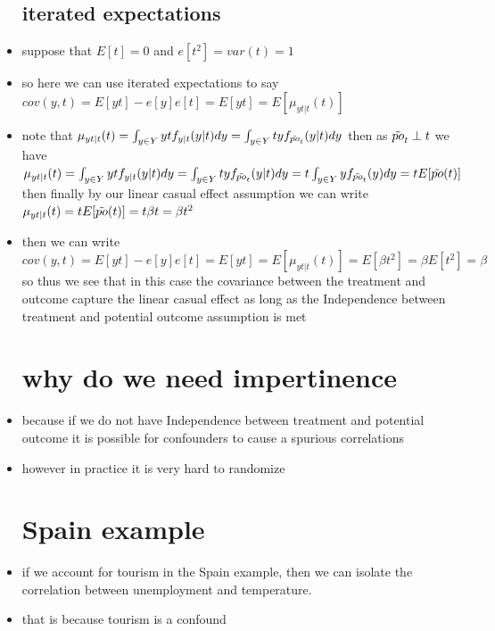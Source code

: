 \documentclass{article}
\begin{document}
\begin{itemize}
\subsection{iterated expectations}
\item suppose that $E[t]=0$ and $e[t^2]=var(t)=1$
\item so here we can use iterated expectations to say $cov(y,t)=E[yt]-e[y]e[t]=E[yt]=E[\mu_{yt|t}(t)]$
\item note that $\mu_{yt|t}(t)=\int_{y\in Y}ytf_{y|t}(y|t)dy=\int_{y\in Y}tyf_{\Tilde{po}_{t}}(y|t)dy$ then as $\Tilde{po}_{t}\perp t$ we have $\mu_{yt|t}(t)=\int_{y\in Y}ytf_{y|t}(y|t)dy=\int_{y\in Y}tyf_{\Tilde{po}_{t}}(y|t)dy=t\int_{y\in Y}yf_{\Tilde{po}_{t}}(y)dy=tE[\Tilde{po}(t)]$ then finally by our linear casual effect assumption we can write $\mu_{yt|t}(t)=tE[\Tilde{po}(t)]=t\beta t=\beta t^2$
\item then we can write $cov(y,t)=E[yt]-e[y]e[t]=E[yt]=E[\mu_{yt|t}(t)]=E[\beta t^2]=\beta E[t^2]=\beta $ so thus we see that in this case the covariance between the treatment and outcome capture the linear casual effect as long as the Independence between treatment and potential outcome assumption is met 
\section{why do we need impertinence}
\item because if we do not have Independence between treatment and potential outcome it is possible for confounders to cause a spurious correlations 
\item however in practice it is very hard to randomize 
\section{Spain example}
\item if we account for tourism in the Spain example, then we can isolate the correlation between unemployment and temperature.
\item that is because tourism is a confound

\end{itemize}
\end{document}
